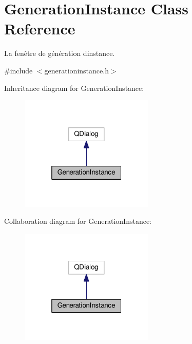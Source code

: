 \hypertarget{classGenerationInstance}{}\section{Generation\+Instance Class Reference}
\label{classGenerationInstance}


La fenêtre de génération d\textquotesingle{}instance.  




{\ttfamily \#include $<$generationinstance.\+h$>$}



Inheritance diagram for Generation\+Instance\+:\nopagebreak
\begin{figure}[H]
\begin{center}
\leavevmode
\includegraphics[width=181pt]{classGenerationInstance__inherit__graph}
\end{center}
\end{figure}


Collaboration diagram for Generation\+Instance\+:\nopagebreak
\begin{figure}[H]
\begin{center}
\leavevmode
\includegraphics[width=181pt]{classGenerationInstance__coll__graph}
\end{center}
\end{figure}
